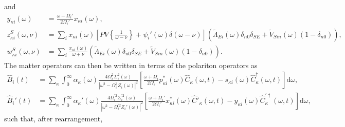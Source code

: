 \documentclass{article}
\begin{document}
and
\begin{equation}
\begin{split}
y_{\kappa i}(\omega) &= \frac{\omega - \Omega_i'}{2\Omega_i'}x_{\kappa i}(\omega),\\
z_{\kappa i}^S(\omega,\nu) &= \sum_{i}x_{\kappa i}(\omega)\left[PV\left\{\frac{1}{\omega - \nu}\right\} + \psi_i'(\omega)\delta(\omega - \nu)\right]\left(\tilde{\Lambda}_{Ei}(\omega)\delta_{n0}\delta_{SE} + \tilde{V}_{Sin}(\omega)(1 - \delta_{n0})\right),\\
w_{\kappa i}^S(\omega,\nu) &= \sum_i\frac{x_{\kappa i}(\omega)}{\omega + \nu}\left(\tilde{\Lambda}_{Ei}(\omega)\delta_{n0}\delta_{SE} + \tilde{V}_{Sin}(\omega)(1 - \delta_{n0})\right).
\end{split}
\end{equation}
The matter operators can then be written in terms of the polariton operators as
\begin{equation}
\begin{split}
\hat{B}_i(t) &= \sum_\kappa\int_0^\infty\alpha_\kappa(\omega)\frac{4\Omega_i^2\Sigma_i^2(\omega)}{|\omega^2 - \Omega_i^2Z_i(\omega)|^2}\left[\frac{\omega + \Omega_i}{2\Omega_i}p_{\kappa i}^*(\omega)\hat{C}_\kappa(\omega,t) - s_{\kappa i}(\omega)\hat{C}_\kappa^\dagger(\omega,t)\right]\mathrm{d}\omega,\\
\hat{B}_i'(t) &= \sum_\kappa\int_0^\infty\alpha_\kappa'(\omega)\frac{4\Omega_i^{\prime2}\Sigma_i^{\prime2}(\omega)}{|\omega^2 - \Omega_i^{\prime2}Z_i'(\omega)|^2}\left[\frac{\omega + \Omega_i'}{2\Omega_i'}x_{\kappa i}^*(\omega)\hat{C}'_\kappa(\omega,t) - y_{\kappa i}(\omega)\hat{C}_\kappa^{\prime\dagger}(\omega,t)\right]\mathrm{d}\omega,
\end{split} 
\end{equation}
such that, after rearrangement,
\end{document}
